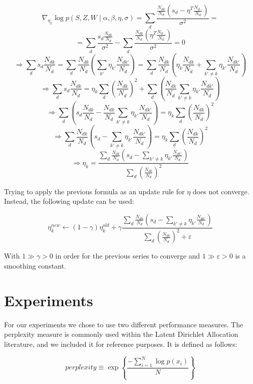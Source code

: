 \documentclass[a4paper,10pt]{article}
\renewcommand{\epsilon}{\varepsilon}
\begin{document}
$$ \nabla_{\eta_k} \log p(S, Z, W \mid \alpha, \beta, \eta, \sigma) = \sum_d \frac{ \frac{N_{dk}}{N_d} \left( s_d - \eta^T \frac{N_{d\cdot}}{N_d}\right) }{\sigma^2} = $$
$$ = \sum_d \frac{s_d \frac{N_{dk}}{N_d} }{\sigma^2} - \sum_d \frac{ \frac{N_{dk}}{N_d} \left( \eta^T \frac{N_{d\cdot}}{N_d} \right) }{\sigma^2} = 0 $$
$$ \Rightarrow \sum_d s_d \frac{N_{dk}}{N_d} = \sum_d \frac{N_{dk}}{N_d} \left( \sum_{k'} \eta_{k'} \frac{N_{dk'}}{N_d} \right) = \sum_d \frac{N_{dk}}{N_d} \left( \eta_k \frac{N_{dk}}{N_d} + \sum_{k' \ne k} \eta_{k'} \frac{N_{dk'}}{N_d} \right) $$
$$ \Rightarrow \sum_d s_d \frac{N_{dk}}{N_d} = \eta_k \sum_d \left( \frac{N_{dk}}{N_d}  \right)^2 + \sum_d \left( \frac{N_{dk}}{N_d} \sum_{k' \ne k} \eta_{k'} \frac{N_{dk'}}{N_d} \right) $$
$$ \Rightarrow \sum_d \left( s_d \frac{N_{dk}}{N_d} - \frac{N_{dk}}{N_d} \sum_{k' \ne k} \eta_{k'} \frac{N_{dk'}}{N_d} \right) = \eta_k \sum_d \left( \frac{N_{dk}}{N_d}  \right)^2 $$
$$ \Rightarrow \sum_d \frac{N_{dk}}{N_d} \left( s_d - \sum_{k' \ne k} \eta_{k'} \frac{N_{dk'}}{N_d} \right) = \eta_k \sum_d \left( \frac{N_{dk}}{N_d}  \right)^2 $$
$$ \Rightarrow \eta_k = \frac{\sum_d \frac{N_{dk}}{N_d} \left( s_d - \sum_{k' \ne k} \eta_{k'} \frac{N_{dk'}}{N_d} \right)}{\sum_d \left( \frac{N_{dk}}{N_d}  \right)^2} $$

Trying to apply the previous formula as an update rule for $\eta$ does not converge. Instead, the following update can be used:

$$ \eta_k^{new} \leftarrow (1 - \gamma) \eta_k^{old} + \gamma \frac{\sum_d \frac{N_{dk}}{N_d} \left( s_d - \sum_{k' \ne k} \eta_{k'} \frac{N_{dk'}}{N_d} \right)}{\sum_d \left( \frac{N_{dk}}{N_d}  \right)^2 + \epsilon}$$

With $1 \gg \gamma > 0$ in order for the previous series to converge and $1 \gg \epsilon > 0$ is a smoothing constant.

\section{Experiments}

For our experiments we chose to use two different performance measures. The perplexity measure is commonly used within the Latent Dirichlet Allocation literature, and we included it for reference purposes. It is defined as follows:

\begin{equation}
	perplexity \equiv \exp \left\{ \frac{- \sum_{i = 1}^N \log p(x_i) }{N} \right\}
\end{equation}
\end{document}
